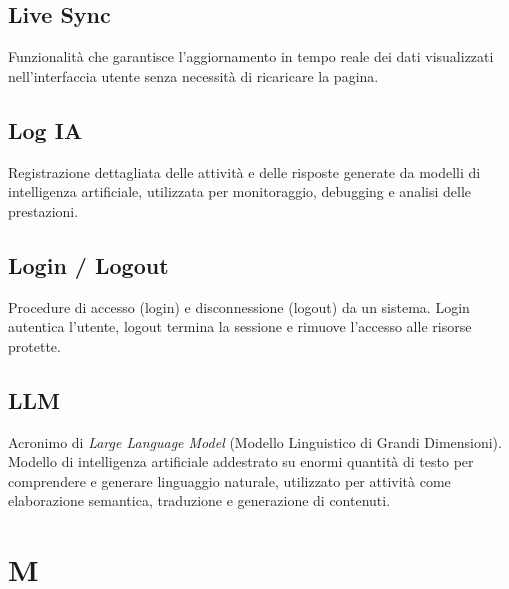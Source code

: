 \documentclass[a4paper, 11pt, oneside]{scrartcl} %
\begin{document}
\vspace{0.5cm}

\subsection*{Live Sync}
Funzionalità che garantisce l'aggiornamento in tempo reale dei dati visualizzati nell'interfaccia utente senza necessità di ricaricare la pagina.
\vspace{0.5cm}

\subsection*{Log IA}


Registrazione dettagliata delle attività e delle risposte generate da modelli di intelligenza artificiale, utilizzata per monitoraggio, debugging e analisi delle prestazioni.

\vspace{0.5cm}

\subsection*{Login / Logout}


Procedure di accesso (login) e disconnessione (logout) da un sistema. Login autentica l'utente, logout termina la sessione e rimuove l'accesso alle risorse protette.

\vspace{0.5cm}

\subsection*{LLM}
Acronimo di \textit{Large Language Model} (Modello Linguistico di Grandi Dimensioni). Modello di intelligenza artificiale addestrato su enormi quantità di testo per comprendere e generare linguaggio naturale, utilizzato per attività come elaborazione semantica, traduzione e generazione di contenuti.
\vspace{0.5cm}


\section*{M}
\end{document}
